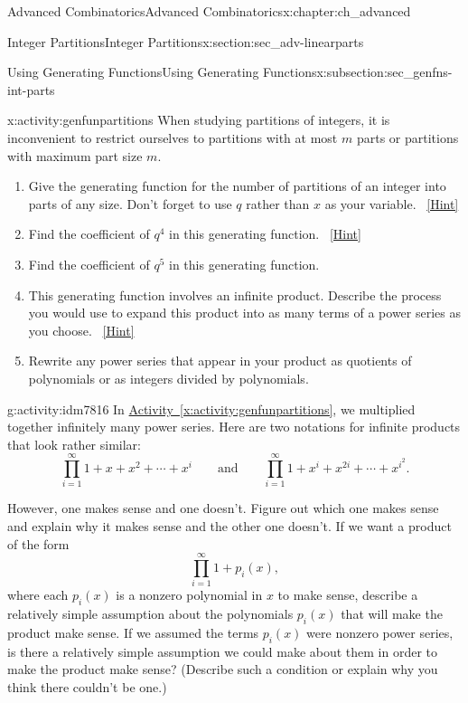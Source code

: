 \documentclass[oneside,10pt,]{book}
\numberwithin{equation}{chapter}
\begin{document}
\begin{chapterptx}{Advanced Combinatorics}{}{Advanced Combinatorics}{}{}{x:chapter:ch_advanced}
\begin{sectionptx}{Integer Partitions}{}{Integer Partitions}{}{}{x:section:sec_adv-linearparts}
\begin{subsectionptx}{Using Generating Functions}{}{Using Generating Functions}{}{}{x:subsection:sec_genfns-int-parts}
\begin{activity}{}{x:activity:genfunpartitions}
When studying partitions of integers, it is inconvenient to restrict ourselves to partitions with at most \(m\) parts or partitions with maximum part size \(m\).%
\begin{enumerate}[font=\bfseries,label=(\alph*),ref=\alph*]
\item{}Give the generating function for the number of partitions of an integer into parts of any size. Don't forget to use \(q\) rather than \(x\) as your variable.%
\qquad~\hfill{\tiny\hyperlink{g:hint:idm7753-back}{[Hint]}}\item{}Find the coefficient of \(q^4\) in this generating function.%
\qquad~\hfill{\tiny\hyperlink{g:hint:idm7763-back}{[Hint]}}\item{}Find the coefficient of \(q^5\) in this generating function.%
\item{}This generating function involves an infinite product. Describe the process you would use to expand this product into as many terms of a power series as you choose.%
\qquad~\hfill{\tiny\hyperlink{g:hint:idm7801-back}{[Hint]}}\item{}Rewrite any power series that appear in your product as quotients of polynomials or as integers divided by polynomials.%
\end{enumerate}
\end{activity}
\begin{activity}{}{g:activity:idm7816}%
In \hyperref[x:activity:genfunpartitions]{Activity~\ref{x:activity:genfunpartitions}}, we multiplied together infinitely many power series. Here are two notations for infinite products that look rather similar:%
\begin{equation*}
\prod_{i=1}^\infty 1 + x + x^2 +\cdots+ x^i\qquad\mbox{and}\qquad
\prod_{i=1}^\infty 1 +x^i +x^{2i} +\cdots + x^{i^2}.
\end{equation*}
%
\par
However, one makes sense and one doesn't. Figure out which one makes sense and explain why it makes sense and the other one doesn't. If we want a product of the form%
\begin{equation*}
\prod_{i=1}^\infty 1 +p_i(x),
\end{equation*}
where each \(p_i(x)\) is a nonzero polynomial in \(x\) to make sense, describe a relatively simple assumption about the polynomials \(p_i(x)\) that will make the product make sense. If we assumed the terms \(p_i(x)\) were nonzero power series, is there a relatively simple assumption we could make about them in order to make the product make sense? (Describe such a condition or explain why you think there couldn't be one.)%

\end{activity}
\end{subsectionptx}
\end{sectionptx}
\end{chapterptx}
\end{document}
